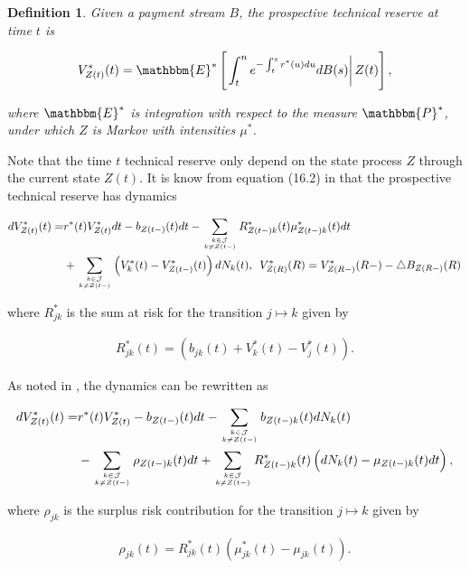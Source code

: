 \documentclass{article}
\newcommand{\1}[1]{\mathbbm{1}_{\left\lbrace #1 \right\rbrace}}
\newcommand{\econdStar}[2][def]{\mathbbm{E}^* \left[ \left. #1 \right| #2 \right]}
\theoremstyle{break}
\newtheorem{definition}{Definition}[section]
\theoremstyle{remark}
\numberwithin{equation}{section}
\begin{document}
\begin{definition}
	Given a payment stream $B$, the prospective technical reserve at time $t$ is
	
	\begin{align*}
		V_{Z(t)}^*(t) = \econdStar[\int_t^n e^{-\int_t^s r^*(u)du} dB(s)]{Z(t)},
	\end{align*}
	
	where $\mathbbm{E}^*$ is integration with respect to the measure $\mathbbm{P}^*$, under which $Z$ is Markov with intensities $\mu^*$.
\end{definition}

Note that the time $t$ technical reserve only depend on the state process $Z$ through the current state $Z(t)$. It is know from equation (16.2) in \cite{LivStok} that the prospective technical reserve has dynamics

\begin{align*}
	dV_{Z(t)}^*(t) =& r^*(t) V_{Z(t)}^* dt - b_{Z(t-)}(t) dt - \sum_{k \in \mathcal{J} \atop k \neq Z(t-)} R_{Z(t-)k}^*(t) \mu_{Z(t-)k}^*(t) dt \\
	&+ \sum_{k \in \mathcal{J} \atop k \neq Z(t-)} \left( V_k^*(t) - V_{Z(t-)}^*(t) \right) dN_k(t), \, \, \, V_{Z(R)}^*(R) =  V_{Z(R-)}^*(R-) - \triangle B_{Z(R-)}(R)
\end{align*}

where $R_{jk}^*$ is the sum at risk for the transition $j \mapsto k$ given by

\begin{align*}
	R_{jk}^*(t) = \left( b_{jk}(t) + V_{k}^*(t) - V_{j}^*(t) \right).
\end{align*}

As noted in \cite{Lollike}, the dynamics can be rewritten as

\begin{align} \label{ReserveDynamics}
\begin{split}
	dV_{Z(t)}^*(t) =& r^*(t) V_{Z(t)}^* - b_{Z(t-)}(t) dt - \sum_{k \in \mathcal{J} \atop k \neq Z(t-)} b_{Z(t-)k}(t) dN_k(t) \\
	&- \sum_{k \in \mathcal{J} \atop k \neq Z(t-)} \rho_{Z(t-)k}(t) dt + \sum_{k \in \mathcal{J} \atop k \neq Z(t-)} R_{Z(t-)k}^*(t) \left( dN_k(t) - \mu_{Z(t-)k}(t) dt \right),
\end{split}
\end{align}

where $\rho_{jk}$ is the surplus risk contribution for the transition $j \mapsto k$ given by

\begin{align*}
	\rho_{jk}(t) = R_{jk}^*(t) \left( \mu_{jk}^*(t) - \mu_{jk}(t) \right).
\end{align*}
\end{document}
